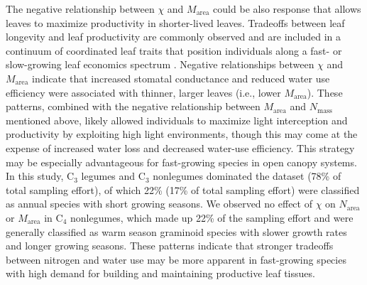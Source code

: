 The negative relationship between $\chi$ and $M_\mathrm{area}$ could be also response that allows leaves to maximize productivity in shorter-lived leaves. Tradeoffs between leaf longevity and leaf productivity are commonly observed and are included in a continuum of coordinated leaf traits that position individuals along a fast- or slow-growing leaf economics spectrum . Negative relationships between $\chi$ and $M_\mathrm{area}$ indicate that increased stomatal conductance and reduced water use efficiency were associated with thinner, larger leaves (i.e., lower $M_\mathrm{area}$). These patterns, combined with the negative relationship between $M_\mathrm{area}$ and $N_\mathrm{mass}$ mentioned above, likely allowed individuals to maximize light interception and productivity by exploiting high light environments, though this may come at the expense of increased water loss and decreased water-use efficiency. This strategy may be especially advantageous for fast-growing species in open canopy systems. In this study, C$_3$ legumes and C$_3$ nonlegumes dominated the dataset (78\% of total sampling effort), of which 22\% (17\% of total sampling effort) were classified as annual species with short growing seasons. We observed no effect of $\chi$ on $N_\mathrm{area}$ or $M_\mathrm{area}$ in C$_4$ nonlegumes, which made up 22\% of the sampling effort and were generally classified as warm season graminoid species with slower growth rates and longer growing seasons. These patterns indicate that stronger tradeoffs between nitrogen and water use may be more apparent in fast-growing species with high demand for building and maintaining productive leaf tissues.

